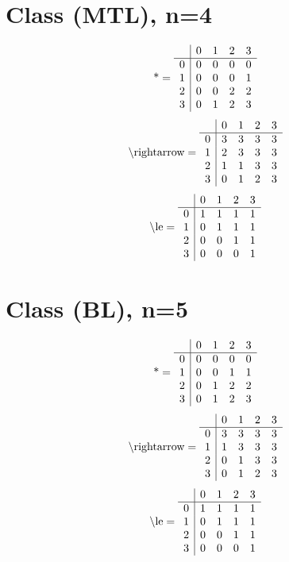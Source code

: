 \documentclass[11pt]{article}
\begin{document}
\section{Class (MTL), n=4}
\[\text{*} = 
\begin{array}{r | r r r r}
 & 0 & 1 & 2 & 3 \\ \hline
0 & 0 & 0 & 0 & 0 \\
1 & 0 & 0 & 0 & 1 \\
2 & 0 & 0 & 2 & 2 \\
3 & 0 & 1 & 2 & 3 \\
\end{array}
\]
\[\text{\textbackslash rightarrow} = 
\begin{array}{r | r r r r}
 & 0 & 1 & 2 & 3 \\ \hline
0 & 3 & 3 & 3 & 3 \\
1 & 2 & 3 & 3 & 3 \\
2 & 1 & 1 & 3 & 3 \\
3 & 0 & 1 & 2 & 3 \\
\end{array}
\]
\[\text{\textbackslash le} = 
\begin{array}{r | r r r r}
 & 0 & 1 & 2 & 3 \\ \hline
0 & 1 & 1 & 1 & 1 \\
1 & 0 & 1 & 1 & 1 \\
2 & 0 & 0 & 1 & 1 \\
3 & 0 & 0 & 0 & 1 \\
\end{array}
\]

\section{Class (BL), n=5}
\[\text{*} = 
\begin{array}{r | r r r r}
 & 0 & 1 & 2 & 3 \\ \hline
0 & 0 & 0 & 0 & 0 \\
1 & 0 & 0 & 1 & 1 \\
2 & 0 & 1 & 2 & 2 \\
3 & 0 & 1 & 2 & 3 \\
\end{array}
\]
\[\text{\textbackslash rightarrow} = 
\begin{array}{r | r r r r}
 & 0 & 1 & 2 & 3 \\ \hline
0 & 3 & 3 & 3 & 3 \\
1 & 1 & 3 & 3 & 3 \\
2 & 0 & 1 & 3 & 3 \\
3 & 0 & 1 & 2 & 3 \\
\end{array}
\]
\[\text{\textbackslash le} = 
\begin{array}{r | r r r r}
 & 0 & 1 & 2 & 3 \\ \hline
0 & 1 & 1 & 1 & 1 \\
1 & 0 & 1 & 1 & 1 \\
2 & 0 & 0 & 1 & 1 \\
3 & 0 & 0 & 0 & 1 \\
\end{array}
\]
\end{document}
